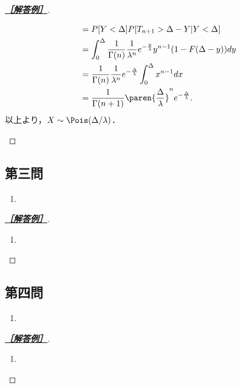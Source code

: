 \documentclass[uplatex,dvipdfmx]{jsarticle}
\begin{document}
\begin{proof}[\textbf{\underline{［解答例］}}]
\begin{enumerate}
\begin{enumerate}
\begin{align*}
                &=P[Y<\Delta]P[T_{n+1}>\Delta-Y|Y<\Delta]\\
                &=\int^\Delta_0\frac{1}{\Gamma(n)}\frac{1}{\lambda^n}e^{-\frac{y}{\lambda}}y^{n-1}(1-F(\Delta-y))dy\\
                &=\frac{1}{\Gamma(n)}\frac{1}{\lambda^n}e^{-\frac{\Delta}{\lambda}}\int^\Delta_0x^{n-1}dx\\
                &=\frac{1}{\Gamma(n+1)}\paren{\frac{\Delta}{\lambda}}^{n}e^{-\frac{\Delta}{\lambda}}.
            \end{align*}
            以上より，$X\sim\Pois(\Delta/\lambda)$．
        \end{enumerate}
    \end{enumerate}
\end{proof}

\subsection{第三問}

\begin{tcolorbox}[colframe=ForestGreen, colback=ForestGreen!10!white,breakable,colbacktitle=ForestGreen!40!white,coltitle=black,fonttitle=\bfseries\sffamily,
    title=第３問]
    \begin{problem}\mbox{}
        \begin{enumerate}[{問}1]
            \item 
        \end{enumerate}
    \end{problem}
\end{tcolorbox}
\begin{proof}[\textbf{\underline{［解答例］}}]\mbox{}
    \begin{enumerate}
        \item 
    \end{enumerate}
\end{proof}

\subsection{第四問}

\begin{tcolorbox}[colframe=ForestGreen, colback=ForestGreen!10!white,breakable,colbacktitle=ForestGreen!40!white,coltitle=black,fonttitle=\bfseries\sffamily,
    title=第４問]
    \begin{problem}\mbox{}
        \begin{enumerate}[{問}1]
            \item 
        \end{enumerate}
    \end{problem}
\end{tcolorbox}
\begin{proof}[\textbf{\underline{［解答例］}}]\mbox{}
    \begin{enumerate}
        \item 
    \end{enumerate}
\end{proof}
\end{document}
